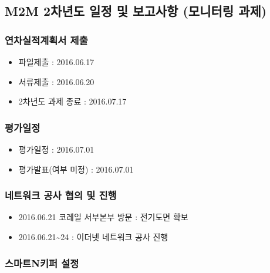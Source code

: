 \documentclass[]{article}
\author{}
\date{}
\begin{document}
{
\hypersetup{linkcolor=black}
\setcounter{tocdepth}{3}
}
\subsection{M2M 2차년도 일정 및 보고사항 (모니터링
과제)}\label{m2m-2uxcc28uxb144uxb3c4-uxc77cuxc815-uxbc0f-uxbcf4uxace0uxc0acuxd56d-uxbaa8uxb2c8uxd130uxb9c1-uxacfcuxc81c}

\subsubsection{연차실적계획서
제출}\label{uxc5f0uxcc28uxc2e4uxc801uxacc4uxd68duxc11c-uxc81cuxcd9c}

\begin{itemize}
\itemsep1pt\parskip0pt
\item
  파일제출 : 2016.06.17
\item
  서류제출 : 2016.06.20
\item
  2차년도 과제 종료 : 2016.07.17
\end{itemize}

\subsubsection{평가일정}\label{uxd3c9uxac00uxc77cuxc815}

\begin{itemize}
\itemsep1pt\parskip0pt
\item
  평가일정 : 2016.07.01
\item
  평가발표(여부 미정) : 2016.07.01
\end{itemize}

\subsubsection{네트워크 공사 협의 및
진행}\label{uxb124uxd2b8uxc6ccuxd06c-uxacf5uxc0ac-uxd611uxc758-uxbc0f-uxc9c4uxd589}

\begin{itemize}
\itemsep1pt\parskip0pt
\item
  2016.06.21 코레일 서부본부 방문 : 전기도면 확보
\item
  2016.06.21\textasciitilde{}24 : 이더넷 네트워크 공사 진행
\end{itemize}

\subsubsection{스마트N키퍼
설정}\label{uxc2a4uxb9c8uxd2b8nuxd0a4uxd37c-uxc124uxc815}
\end{document}
